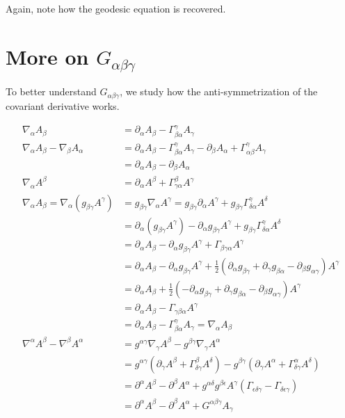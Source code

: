 \documentclass[11pt]{article}
\begin{document}
Again, note how the geodesic equation is recovered.

\section{More on $G_{\alpha\beta\gamma}$}
To better understand $G_{\alpha\beta\gamma}$, we study how the anti-symmetrization of the covariant derivative works.

\begin{equation}
\begin{aligned}
\nabla_\alpha A_\beta &= \partial_\alpha A_\beta - \Gamma^\gamma_{\beta\alpha} A_\gamma  \\
\nabla_\alpha A_\beta - \nabla_\beta A_\alpha &= \partial_\alpha A_\beta - \Gamma^\gamma_{\beta\alpha} A_\gamma -\partial_\beta A_\alpha + \Gamma^\gamma_{\alpha\beta} A_\gamma  \\
&= \partial_\alpha A_\beta -\partial_\beta A_\alpha  \\
\nabla_\alpha A^\beta &= \partial_\alpha A^\beta + \Gamma^\beta_{\gamma\alpha} A^\gamma  \\
\nabla_\alpha A_\beta = \nabla_\alpha ( g_{\beta\gamma} A^\gamma) &= g_{\beta\gamma} \nabla_\alpha A^\gamma = g_{\beta\gamma} \partial_\alpha A^\gamma + g_{\beta\gamma} \Gamma^\gamma_{\delta\alpha} A^\delta \\
&= \partial_\alpha (g_{\beta\gamma} A^\gamma) - \partial_\alpha g_{\beta\gamma} A^\gamma + g_{\beta\gamma} \Gamma^\gamma_{\delta\alpha} A^\delta \\
&= \partial_\alpha A_\beta - \partial_\alpha g_{\beta\gamma} A^\gamma +  \Gamma_{\beta\gamma\alpha} A^\gamma \\
&= \partial_\alpha A_\beta - \partial_\alpha g_{\beta\gamma} A^\gamma +  \frac{1}{2} (\partial_\alpha g_{\beta\gamma} + \partial_\gamma g_{\beta\alpha} - \partial_\beta g_{\alpha\gamma}) A^\gamma \\
&= \partial_\alpha A_\beta +  \frac{1}{2} ( - \partial_\alpha g_{\beta\gamma} + \partial_\gamma g_{\beta\alpha} - \partial_\beta g_{\alpha\gamma}) A^\gamma \\
&= \partial_\alpha A_\beta - \Gamma_{\gamma\beta\alpha} A^\gamma \\
&= \partial_\alpha A_\beta - \Gamma^\gamma_{\beta\alpha} A_\gamma = \nabla_\alpha A_\beta \\
\nabla^\alpha A^\beta - \nabla^\beta A^\alpha &= g^{\alpha\gamma} \nabla_\gamma A^\beta - g^{\beta\gamma} \nabla_\gamma A^\alpha \\
&= g^{\alpha\gamma} (\partial_\gamma A^\beta + \Gamma^\beta_{\delta\gamma} A^\delta) - g^{\beta\gamma} (\partial_\gamma A^\alpha + \Gamma^\alpha_{\delta\gamma} A^\delta) \\
&= \partial^\alpha A^\beta - \partial^\beta A^\alpha + g^{\alpha\delta} g^{\beta\epsilon} A^\gamma( \Gamma_{\epsilon\delta\gamma} - \Gamma_{\delta\epsilon\gamma}) \\
&= \partial^\alpha A^\beta - \partial^\beta A^\alpha + G^{\alpha\beta\gamma} A_\gamma \\
\end{aligned}
\end{equation}
\end{document}
